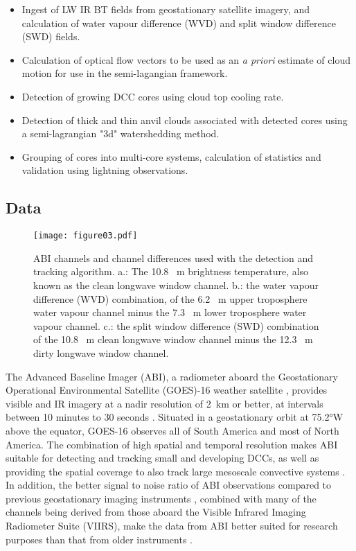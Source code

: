 \begin{itemize}
    \item Ingest of LW IR BT fields from geostationary satellite imagery, and calculation of water vapour difference (WVD) and split window difference (SWD) fields.
    \item Calculation of optical flow vectors to be used as an \textit{a priori} estimate of cloud motion for use in the semi-lagangian framework.
    \item Detection of growing DCC cores using cloud top cooling rate.
    \item Detection of thick and thin anvil clouds associated with detected cores using a semi-lagrangian "3d" watershedding method. 
    \item Grouping of cores into multi-core systems, calculation of statistics and validation using lightning observations.
\end{itemize}

\subsection{Data}

\begin{figure}[t]
    \centering
    \texttt{[image: figure03.pdf]}
    \caption{ABI channels and channel differences used with the detection and tracking algorithm. a.: The 10.8 \unit{\mu m} brightness temperature, also known as the clean longwave window channel. b.: the water vapour difference (WVD) combination, of the 6.2 \unit{\mu m} upper troposphere water vapour channel minus the 7.3 \unit{\mu m} lower troposphere water vapour channel. c.: the split window difference (SWD) combination of the 10.8 \unit{\mu m} clean longwave window channel minus the 12.3 \unit{\mu m} dirty longwave window channel.}
    \label{fig:abi_channels}
\end{figure}

The Advanced Baseline Imager (ABI), a radiometer aboard the Geostationary Operational Environmental Satellite (GOES)-16 weather satellite \citep{schmit_closer_2016}, provides visible and IR imagery at a nadir resolution of 2~\unit{km} or better, at intervals between 10 minutes to 30 seconds \citep{schmit_chapter_2020}.
Situated in a geostationary orbit at 75.2°W above the equator, GOES-16 observes all of South America and most of North America.
The combination of high spatial and temporal resolution makes ABI suitable for detecting and tracking small and developing DCCs, as well as providing the spatial coverage to also track large mesoscale convective systems \citep{heikenfeld_tobac_2019}.
In addition, the better signal to noise ratio of ABI observations compared to previous geostationary imaging instruments \citep{iacovazzi_goes-16_2020}, combined with many of the channels being derived from those aboard the Visible Infrared Imaging Radiometer Suite (VIIRS), make the data from ABI better suited for research purposes than that from older instruments \citep{heidinger_chapter_2020}.

